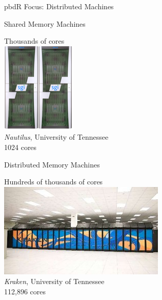 \begin{frame}
  \begin{block}{pbdR Focus:  Distributed Machines}
   \begin{center}
    \begin{minipage}[t]{.47\textwidth}
    \begin{block}{\centering Shared Memory Machines}
    \begin{center}
    Thousands of cores\\[.2cm]
    \includegraphics[scale=.65]{pics/nautilus}\\
    {\tiny \emph{Nautilus}, University of Tennessee\\1024 cores}
    \end{center}
    \end{block}
    \end{minipage}
    \hspace{.1cm}
    \begin{minipage}[t]{.47\textwidth}
    \begin{block}{\centering Distributed Memory Machines}
    \begin{center}
    Hundreds of thousands of cores\\[.2cm]
    \includegraphics[width=.95\textwidth]{pics/kraken}\\
    {\tiny \emph{Kraken}, University of Tennessee\\ 112,896 cores}
    \end{center}
    \end{block}
    \end{minipage}
    \end{center}
    \end{block}
\end{frame}

